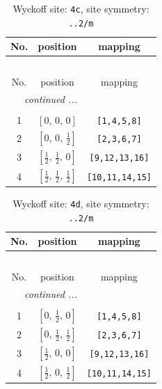 \documentclass[fleqn,8pt]{jsarticle}
\begin{document}
\renewcommand{\arraystretch}{1.2}
\begin{longtable}{ccc}
\caption{Wyckoff site: {\tt 4c}, site symmetry: {\tt ..2/m}}
 \\
 \hline \hline
No. & position & mapping \\ \hline \endfirsthead

\multicolumn{2}{l}{\tablename\ \thetable{}} \\
 \hline \hline
No. & position & mapping \\ \hline \endhead

 \hline \hline
\multicolumn{2}{r}{\footnotesize\it continued ...} \\ \endfoot

 \hline \hline
\multicolumn{2}{r}{} \\ \endlastfoot

1 & $\left[ 0,\, 0,\, 0 \right]$ & {\tt [1,4,5,8]} \\ \hline
2 & $\left[ 0,\, 0,\, \frac{1}{2} \right]$ & {\tt [2,3,6,7]} \\ \hline
3 & $\left[ \frac{1}{2},\, \frac{1}{2},\, 0 \right]$ & {\tt [9,12,13,16]} \\ \hline
4 & $\left[ \frac{1}{2},\, \frac{1}{2},\, \frac{1}{2} \right]$ & {\tt [10,11,14,15]} \\
\end{longtable}
\renewcommand{\arraystretch}{1.2}
\begin{longtable}{ccc}
\caption{Wyckoff site: {\tt 4d}, site symmetry: {\tt ..2/m}}
 \\
 \hline \hline
No. & position & mapping \\ \hline \endfirsthead

\multicolumn{2}{l}{\tablename\ \thetable{}} \\
 \hline \hline
No. & position & mapping \\ \hline \endhead

 \hline \hline
\multicolumn{2}{r}{\footnotesize\it continued ...} \\ \endfoot

 \hline \hline
\multicolumn{2}{r}{} \\ \endlastfoot

1 & $\left[ 0,\, \frac{1}{2},\, 0 \right]$ & {\tt [1,4,5,8]} \\ \hline
2 & $\left[ 0,\, \frac{1}{2},\, \frac{1}{2} \right]$ & {\tt [2,3,6,7]} \\ \hline
3 & $\left[ \frac{1}{2},\, 0,\, 0 \right]$ & {\tt [9,12,13,16]} \\ \hline
4 & $\left[ \frac{1}{2},\, 0,\, \frac{1}{2} \right]$ & {\tt [10,11,14,15]} \\
\end{longtable}
\end{document}
